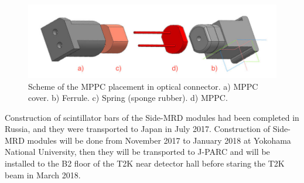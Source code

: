 \begin{figure}[tbh]
\begin{center}
\includegraphics[width=0.8\linewidth]{fig/side_mrd_optical_scheme.jpg}
\end{center}
\caption{
Scheme of the MPPC placement in optical connector.  a) MPPC cover. b) Ferrule. c) Spring (sponge rubber). d) MPPC.
}
\label{fig:side_mrd_optical_scheme}
\end{figure}

Construction of scintillator bars of the Side-MRD modules had been completed in Russia, and they were transported to Japan in July 2017. 
Construction of Side-MRD modules will be done from November 2017 to January 2018 at Yokohama National University, then they will be transported to J-PARC and will be installed to the B2 floor of the T2K near detector hall before staring the T2K beam in March 2018.
